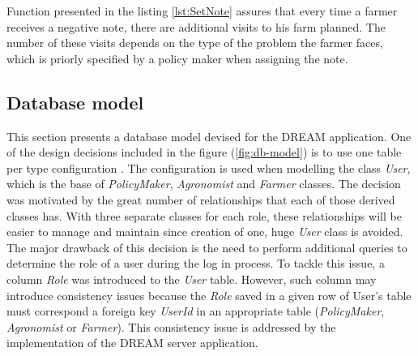 Function presented in the listing \ref{lst:SetNote} assures that every time a farmer receives a negative note, there are additional visits to his farm planned. The number of these visits depends on the type of the problem the farmer faces, which is priorly specified by a policy maker when assigning the note.



\subsection{Database model}

This section presents a database model devised for the DREAM application. One of the design decisions included in the figure (\ref{fig:db-model}) is to use one table per type configuration \cite{ef-Inheritance}. The configuration is used when modelling the class \textit{User}, which is the base of \textit{PolicyMaker}, \textit{Agronomist} and \textit{Farmer} classes. The decision was motivated by the great number of relationships that each of those derived classes has. With three separate classes for each role, these relationships will be easier to manage and maintain since creation of one, huge \textit{User} class is avoided. The major drawback of this decision is the need to perform additional queries to determine the role of a user during the log in process. To tackle this issue, a column \textit{Role} was introduced to the \textit{User} table. However, such column may introduce consistency issues because the \textit{Role} saved in a given row of User's table must correspond a foreign key \textit{UserId} in an appropriate table (\textit{PolicyMaker}, \textit{Agronomist} or \textit{Farmer}). This consistency issue is addressed by the implementation of the DREAM server application.


